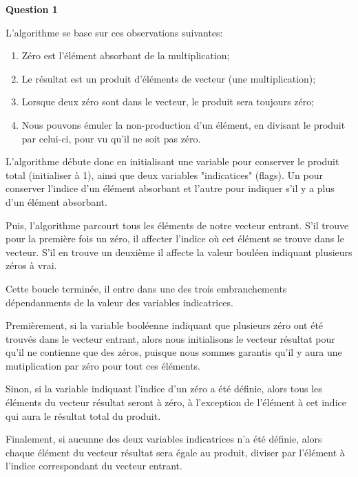 \documentclass[class=article]{standalone}
\begin{document}
\centerline{\Huge \bf Question 1}
\bigskip
{}

L'algorithme se base sur ces observations suivantes:
\begin{enumerate}
    \item Zéro est l'élément absorbant de la multiplication;
    \item Le résultat est un produit d'éléments de vecteur (une multiplication);
    \item Lorsque deux zéro sont dans le vecteur, le produit sera toujours zéro;
    \item Nous pouvons émuler la non-production d'un élément, en divisant le produit par celui-ci, pour vu qu'il ne soit pas zéro.
\end{enumerate}

L'algorithme débute donc en initialisant une variable pour conserver le produit total (initialiser à 1), 
ainsi que deux variables "indicatices" (flags). Un pour conserver l'indice d'un élément absorbant et l'autre pour indiquer s'il y a plus d'un élément absorbant.

Puis, l'algorithme parcourt tous les éléments de notre vecteur entrant. S'il trouve pour la première fois un zéro, il affecter l'indice
où cet élément se trouve dans le vecteur. S'il en trouve un deuxième il affecte la valeur bouléen indiquant plusieurs zéros à vrai. 

Cette boucle terminée, il entre dans une des trois embranchements dépendanments de la valeur des variables indicatrices.

Premièrement, si la variable booléenne indiquant que plusieurs zéro ont été trouvés dans le vecteur entrant,
alors nous initialisons le vecteur résultat pour qu'il ne contienne que des zéros, puisque nous sommes garantis qu'il 
y aura une mutiplication par zéro pour tout ces éléments. 

Sinon, si la variable indiquant l'indice d'un zéro a été définie, alors tous les éléments du vecteur résultat seront
à zéro, à l'exception de l'élément à cet indice qui aura le résultat total du produit.

Finalement, si aucunne des deux variables indicatrices n'a été définie, alors chaque élément du vecteur résultat sera égale au produit, diviser par 
l'élément à l'indice correspondant du vecteur entrant.

\bigskip
{}
\end{document}
